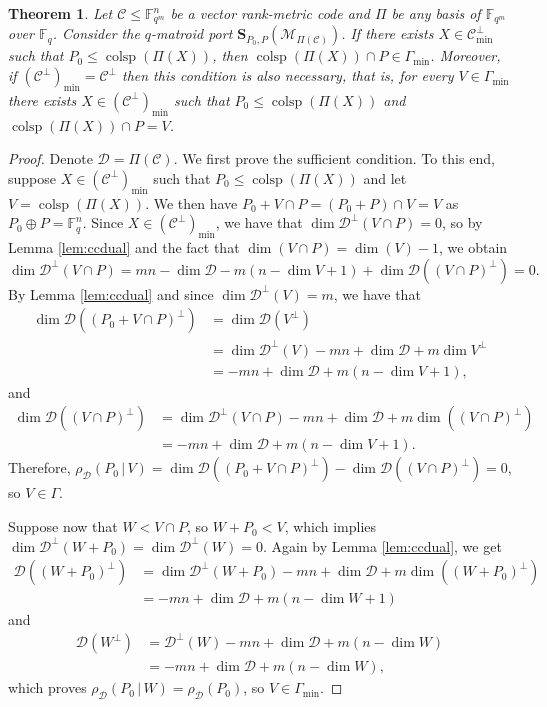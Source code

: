 \documentclass[onecolumn,draftclsnofoot,12pt]{IEEEtran}
\newcommand{\F}{\mathbb{F}}
\newcommand{\C}{\mathcal{C}}
\newcommand{\colsp}{\operatorname{colsp}}
\newcommand{\D}{\mathcal{D}}
\renewcommand{\S}{\mathbf{S}}
\newcommand{\M}{\mathcal{M}}
\theoremstyle{plain} %
\newtheorem{theorem}{Theorem}
\theoremstyle{definition}
\begin{document}
\begin{theorem} \label{thm:minimal}
Let $\C\leq \F_{q^m}^n$ be a vector rank-metric code and $\Pi$ be any basis of $\F_{q^m}$ over $\F_q$. Consider the $q$-matroid port $\S_{P_0,P}(\M_{\Pi(\C)})$. If there exists $X\in \C^\perp_{\min}$ such that $P_0\leq \colsp( \Pi(X))$, then $\colsp(\Pi(X)) \cap P \in \Gamma_{\min}$. Moreover, if $(\C^\perp)_{\min} = \C^\perp$ then this condition is also necessary, that is, for every $V\in \Gamma_{\min}$ there exists $X\in (\C^\perp)_{\min}$ such that $P_0\leq \colsp (\Pi(X))$ and $\colsp (\Pi(X)) \cap P =V$.
\end{theorem}
\begin{proof}
Denote $\D = \Pi(\C)$. We first prove the sufficient condition. To this end, suppose $X\in (\C^\perp)_{\min}$ such that $P_0\leq \colsp( \Pi(X))$ and let $V=\colsp(\Pi(X))$. We then have 
$P_0+V\cap P = (P_0+P) \cap V = V$ as $P_0\oplus P = \F_q^n$. Since $X\in (\C^\perp)_{\min}$, we have that $\dim \D^\perp(V\cap P) = 0$, so by Lemma \ref{lem:ccdual} and the fact that $\dim(V \cap P)= \dim(V)-1$, we obtain
\[
    \dim \D^\perp(V\cap P) = mn - \dim \D - m(n-\dim V +1) + \dim \D((V\cap P)^\perp) = 0.
\]
By Lemma \ref{lem:ccdual} and since $\dim \D^\perp(V) = m$, we have that
\begin{align*}
    \dim \D((P_0 + V\cap P)^\perp) &= \dim \D(V^\perp) \\ 
    &= \dim \D^\perp(V) - mn + \dim \D + m\dim V^\perp \\
    &= -mn + \dim \D + m(n-\dim V +1),
\end{align*}
and
\begin{align*}
    \dim \D((V\cap P)^\perp) &= \dim \D^\perp(V\cap  P) - mn + \dim \D + m\dim( (V\cap P)^\perp) \\
    &= - mn + \dim \D + m(n-\dim V+1).
\end{align*}
Therefore, $\rho_{\D}(P_0\,|\, V) =  \dim \D((P_0 + V\cap P)^\perp)-\dim \D((V\cap P)^\perp)=0$, so $V\in \Gamma$. 

Suppose now that $W<V\cap P$, so $W+ P_0 < V$, which implies $\dim \D^\perp (W+P_0) = \dim \D^\perp(W) = 0$. Again by Lemma \ref{lem:ccdual}, we get
\begin{align*}
    \D((W+P_0)^\perp) &= \dim \D^\perp(W+P_0) -mn + \dim \D + m \dim ((W+P_0)^\perp) \\&= 
    -mn + \dim \D + m (n- \dim W + 1)
\end{align*}
and
\begin{align*}
    \D(W^\perp) &= \D^\perp(W) - mn + \dim \D + m(n-\dim W)\\
    &= -mn + \dim \D + m(n-\dim W),
\end{align*}
which proves $\rho_\D(P_0\,|\, W) = \rho_\D(P_0)$, so $V\in \Gamma_{\min}$.


\end{proof}
\end{document}
